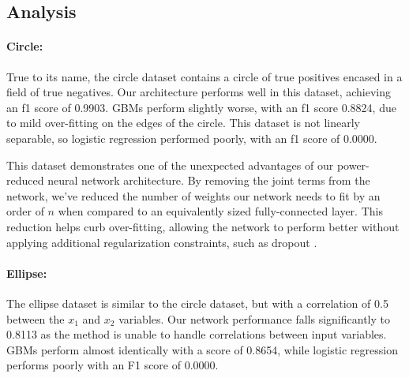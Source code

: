 



    
    
    
    


\subsection{Analysis}

\paragraph{Circle:} True to its name, the circle dataset contains a circle of true positives encased in a field of true negatives. Our architecture performs well in this dataset, achieving an f1 score of 0.9903. GBMs perform slightly worse, with an f1 score 0.8824, due to mild over-fitting on the edges of the circle. This dataset is not linearly separable, so logistic regression performed poorly, with an f1 score of 0.0000. 

This dataset demonstrates one of the unexpected advantages of our power-reduced neural network architecture. By removing the joint terms from the network, we've reduced the number of  weights our network needs to fit by an order of $n$ when compared to an equivalently sized fully-connected layer. This reduction helps curb over-fitting, allowing the network to perform better without applying additional regularization constraints, such as dropout \citep{Srivastava2014Dropout:Overfitting}.


\paragraph{Ellipse:} The ellipse dataset is similar to the circle dataset, but with a correlation of 0.5 between the $x_1$ and $x_2$ variables. Our network performance falls significantly to 0.8113 as the method is unable to handle correlations between input variables. GBMs perform almost identically with a score of 0.8654, while logistic regression performs poorly with an F1 score of 0.0000.

